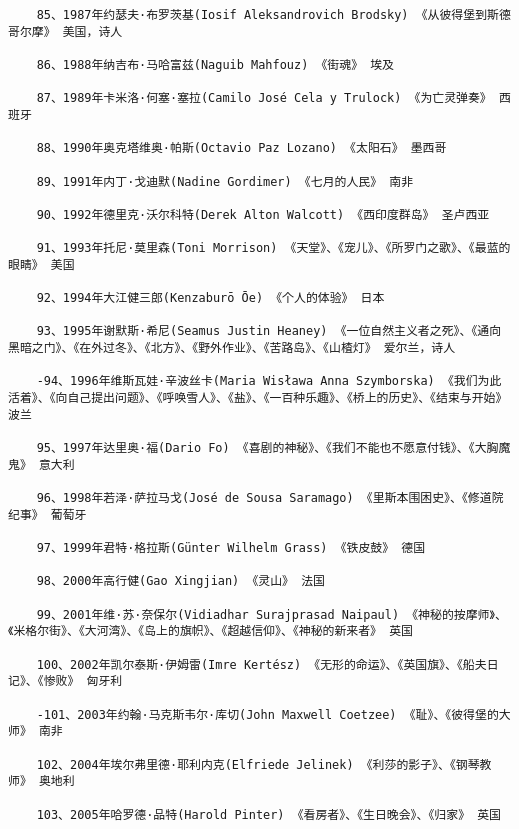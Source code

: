 \documentclass[UTF8]{../RepresentationUniverse}
\begin{document}
\begin{lstlisting}
    85、1987年约瑟夫·布罗茨基(Iosif Aleksandrovich Brodsky) 《从彼得堡到斯德哥尔摩》 美国，诗人
    
    86、1988年纳吉布·马哈富兹(Naguib Mahfouz) 《街魂》 埃及
    
    87、1989年卡米洛·何塞·塞拉(Camilo José Cela y Trulock) 《为亡灵弹奏》 西班牙
    
    88、1990年奥克塔维奥·帕斯(Octavio Paz Lozano) 《太阳石》 墨西哥
    
    89、1991年内丁·戈迪默(Nadine Gordimer) 《七月的人民》 南非
    
    90、1992年德里克·沃尔科特(Derek Alton Walcott) 《西印度群岛》 圣卢西亚
    
    91、1993年托尼·莫里森(Toni Morrison) 《天堂》、《宠儿》、《所罗门之歌》、《最蓝的眼睛》 美国
    
    92、1994年大江健三郎(Kenzaburō Ōe) 《个人的体验》 日本
    
    93、1995年谢默斯·希尼(Seamus Justin Heaney) 《一位自然主义者之死》、《通向黑暗之门》、《在外过冬》、《北方》、《野外作业》、《苦路岛》、《山楂灯》 爱尔兰，诗人
    
    -94、1996年维斯瓦娃·辛波丝卡(Maria Wisława Anna Szymborska) 《我们为此活着》、《向自己提出问题》、《呼唤雪人》、《盐》、《一百种乐趣》、《桥上的历史》、《结束与开始》 波兰
    
    95、1997年达里奥·福(Dario Fo) 《喜剧的神秘》、《我们不能也不愿意付钱》、《大胸魔鬼》 意大利
    
    96、1998年若泽·萨拉马戈(José de Sousa Saramago) 《里斯本围困史》、《修道院纪事》 葡萄牙
    
    97、1999年君特·格拉斯(Günter Wilhelm Grass) 《铁皮鼓》 德国
    
    98、2000年高行健(Gao Xingjian) 《灵山》 法国
    
    99、2001年维·苏·奈保尔(Vidiadhar Surajprasad Naipaul) 《神秘的按摩师》、《米格尔街》、《大河湾》、《岛上的旗帜》、《超越信仰》、《神秘的新来者》 英国
    
    100、2002年凯尔泰斯·伊姆雷(Imre Kertész) 《无形的命运》、《英国旗》、《船夫日记》、《惨败》 匈牙利
    
    -101、2003年约翰·马克斯韦尔·库切(John Maxwell Coetzee) 《耻》、《彼得堡的大师》 南非
    
    102、2004年埃尔弗里德·耶利内克(Elfriede Jelinek) 《利莎的影子》、《钢琴教师》 奥地利
    
    103、2005年哈罗德·品特(Harold Pinter) 《看房者》、《生日晚会》、《归家》 英国
    

\end{lstlisting}
\end{document}
